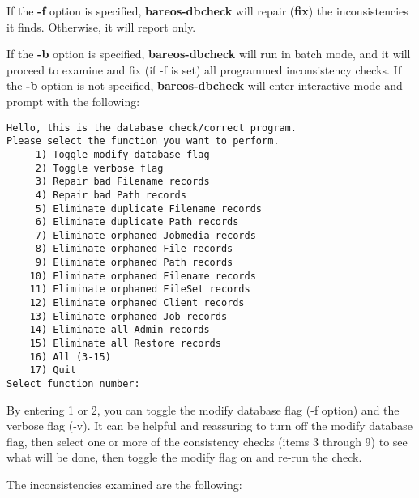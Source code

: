 If the {\bf -f} option is specified, {\bf bareos-dbcheck} will repair ({\bf fix}) the
inconsistencies it finds. Otherwise, it will report only.

If the {\bf -b} option is specified, {\bf bareos-dbcheck} will run in batch mode, and
it will proceed to examine and fix (if -f is set) all programmed inconsistency
checks. If the {\bf -b} option is not specified, {\bf bareos-dbcheck} will enter
interactive mode and prompt with the following:

\footnotesize
\begin{verbatim}
Hello, this is the database check/correct program.
Please select the function you want to perform.
     1) Toggle modify database flag
     2) Toggle verbose flag
     3) Repair bad Filename records
     4) Repair bad Path records
     5) Eliminate duplicate Filename records
     6) Eliminate duplicate Path records
     7) Eliminate orphaned Jobmedia records
     8) Eliminate orphaned File records
     9) Eliminate orphaned Path records
    10) Eliminate orphaned Filename records
    11) Eliminate orphaned FileSet records
    12) Eliminate orphaned Client records
    13) Eliminate orphaned Job records
    14) Eliminate all Admin records
    15) Eliminate all Restore records
    16) All (3-15)
    17) Quit
Select function number:
\end{verbatim}
\normalsize

By entering 1 or 2, you can toggle the modify database flag (-f option) and
the verbose flag (-v). It can be helpful and reassuring to turn off the modify
database flag, then select one or more of the consistency checks (items 3
through 9) to see what will be done, then toggle the modify flag on and re-run
the check.

The inconsistencies examined are the following:

